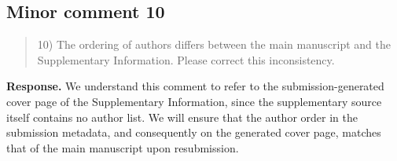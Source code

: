 \documentclass[11pt,a4paper]{article}
\newcommand{\reviewercomment}[1]{\begin{quote}\small #1\end{quote}}
\newcommand{\response}[1]{\par\textbf{Response.} #1\par}
\begin{document}
\subsection*{Minor comment 10}
\label{r1-minor-10}
\reviewercomment{
10) The ordering of authors differs between the main manuscript and the Supplementary Information. Please correct this inconsistency.
}
\response{We understand this comment to refer to the submission-generated cover page of the Supplementary Information, since the supplementary source itself contains no author list. We will ensure that the author order in the submission metadata, and consequently on the generated cover page, matches that of the main manuscript upon resubmission.}
\end{document}

